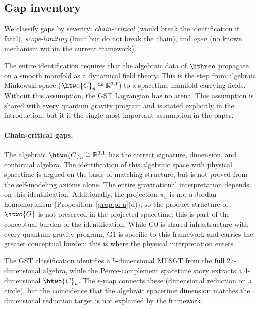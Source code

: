 \subsection{Gap inventory}
\label{sec:gaps}

We classify gaps by severity: \emph{chain-critical} (would break the
identification if fatal), \emph{scope-limiting} (limit but do not break
the chain), and \emph{open} (no known mechanism within the current
framework).

\begin{description}[style=nextline]
\item[G0: Manifold assumption.]
  The entire identification requires that the algebraic data of $\hthree$
  propagate on a smooth manifold as a dynamical field theory. This is the
  step from algebraic Minkowski space ($\htwo{C}_u \cong \mathbb{R}^{3,1}$)
  to a spacetime manifold carrying fields. Without this assumption, the GST
  Lagrangian has no arena. This assumption is shared with every quantum
  gravity program and is stated explicitly in the introduction, but it is
  the single most important assumption in the paper.
\end{description}

\paragraph{Chain-critical gaps.}

\begin{description}[style=nextline]
\item[G1: $\Vzero$ = spacetime identification.]
  The algebraic $\htwo{C}_u \cong \mathbb{R}^{3,1}$ has the correct
  signature, dimension, and conformal algebra. The identification of
  this algebraic space with physical spacetime is argued on the basis
  of matching structure, but is not proved from the self-modeling
  axioms alone. The entire gravitational interpretation depends on this
  identification. Additionally, the projection $\pi_u$ is not a Jordan
  homomorphism (Proposition~\ref{prop:pi-u}(d)), so the product
  structure of $\htwo{O}$ is not preserved in the projected spacetime;
  this is part of the conceptual burden of the identification.
  While G0 is shared infrastructure with every quantum gravity program,
  G1 is specific to this framework and carries the greater conceptual
  burden: this is where the physical interpretation enters.

\item[G2: 5d/4d dimensional mismatch.]
  The GST classification identifies a 5-dimensional MESGT from the full
  27-dimensional algebra, while the Peirce-complement spacetime story
  extracts a 4-dimensional $\htwo{C}_u$. The $r$-map connects these
  (dimensional reduction on a circle), but the coincidence that the
  algebraic spacetime dimension matches the dimensional reduction
  target is not explained by the framework.

\end{description}

